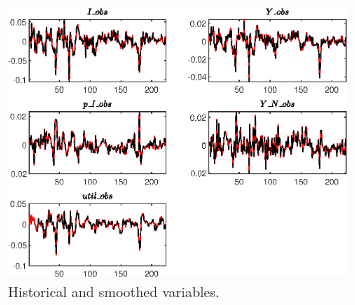  
\begin{figure}[H]
\centering 
\includegraphics[width=0.80\textwidth]{BRS_util/graphs/BRS_util_HistoricalAndSmoothedVariables1}
\caption{Historical and smoothed variables.}\label{Fig:HistoricalAndSmoothedVariables:1}
\end{figure}



